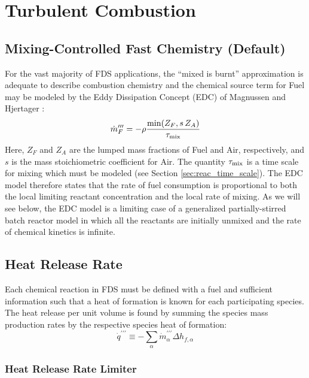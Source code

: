 \section{Turbulent Combustion}

\subsection{Mixing-Controlled Fast Chemistry (Default)}
\label{sec:fastchemistry}

For the vast majority of FDS applications, the ``mixed is burnt'' approximation is adequate to describe combustion chemistry and the chemical source term for Fuel may be modeled by the Eddy Dissipation Concept (EDC) of Magnussen and Hjertager \cite{Magnussen:1,Poinsot:TNC}:
\begin{equation}
\label{eq:edc}
\dot{m}_F^{\prime\prime\prime} = -\rho \frac{\min(Z_F, s\,Z_A)}{\tau_{\rm mix}}
\end{equation}
Here, $Z_F$ and $Z_A$ are the lumped mass fractions of Fuel and Air, respectively, and $s$ is the mass stoichiometric coefficient for Air.  The quantity $\tau_{\rm mix}$ is a time scale for mixing which must be modeled (see Section \ref{sec:reac_time_scale}).  The EDC model therefore states that the rate of fuel consumption is proportional to both the local limiting reactant concentration and the local rate of mixing. As we will see below, the EDC model is a limiting case of a generalized partially-stirred batch reactor model in which all the reactants are initially unmixed and the rate of chemical kinetics is infinite.


\subsection{Heat Release Rate}
\label{sec:hrr}

Each chemical reaction in FDS must be defined with a fuel and sufficient information such that a heat of formation is known for each participating species. The heat release per unit volume is found by summing the species mass production rates by the respective species heat of formation:
\begin{equation}\label{eq:vol_heat_gen}
\dot{q}^{\prime\prime\prime} \equiv -\displaystyle \sum_{\alpha} \dot{m}^{\prime\prime\prime}_{\alpha} \Delta h_{f,\alpha}
\end{equation}

\subsubsection{Heat Release Rate Limiter}

